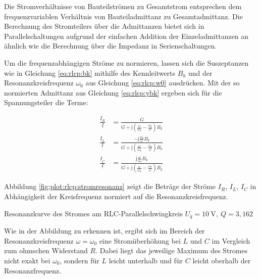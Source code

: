 \begin{frame}
{        Die Stromverhältnisse von Bauteilströmen zu Gesamtstrom entsprechen dem frequenzvariablen Verhältnis von Bauteiladmittanz zu Gesamtadmittanz.
        Die Berechnung des Stromteilers über die Admittanzen bietet sich in Parallelschaltungen aufgrund der einfachen Addition der Einzeladmittanzen
        an ähnlich wie die Berechnung über die Impedanz in Serienschaltungen.
  
        Um die frequenzabhängigen Ströme zu normieren, lassen sich die Suszeptanzen wie in Gleichung \ref{eq:rlcp:bk} 
        mithilfe des Kennleitwerts $B_k$ und der Resonanzkreisfrequenz $\omega_0$ aus Gleichung \ref{eq:rlcp:w0} ausdrücken. 
        Mit der so normierten Admittanz aus Gleichung \ref{eq:rlcp:ybk} ergeben sich für die Spannungsteiler die Terme:
    
        \begin{equation}\label{eq:rlcp:ibk:iq}
            \begin{aligned}
            \frac{\underline{I}_R}{\underline{I}} &= 
                \frac{G}{G+\mathrm{j}\left(\frac{\omega}{\omega_0}-\frac{\omega_0}{\omega}\right)B_k}\\
            \frac{\underline{I}_L}{\underline{I}} &= 
                \frac{-\mathrm{j}\frac{\omega_0}{\omega}B_k}{G+\mathrm{j}\left(\frac{\omega}{\omega_0}-\frac{\omega_0}{\omega}\right)B_k}\\
            \frac{\underline{I}_C}{\underline{I}} &=
                \frac{\mathrm{j}\frac{\omega}{\omega_0}B_k}{G+\mathrm{j}\left(\frac{\omega}{\omega_0}-\frac{\omega_0}{\omega}\right)B_k}
            \end{aligned}
        \end{equation}
    
        Abbildung \ref{fig:plot:rlcp:stromresonanz} zeigt die Beträge der Ströme $I_R$, $I_L$, $I_C$  
        in Abhängigkeit der Kreisfrequenz normiert auf die Resonanzkreisfrequenz.
    
        {Resonanzkurve des Stromes am RLC-Parallelschwingkreis\newline
        $U_q=10\ \mathrm{V},\ Q=3,162$\label{fig:plot:rlcp:stromresonanz}}
    
        Wie in der Abbildung zu erkennen ist, ergibt sich im Bereich der Resonanzkreisfrequenz $\omega = \omega_0$ 
        eine Stromüberhöhung bei $L$ und $C$ im Vergleich zum ohmschen Widerstand $R$.
        Dabei liegt das jeweilige Maximum des Stromes nicht exakt bei $\omega_0$, sondern 
        für $L$ leicht unterhalb und für $C$ leicht oberhalb der Resonanzfrequenz.
   
}
\end{frame}
